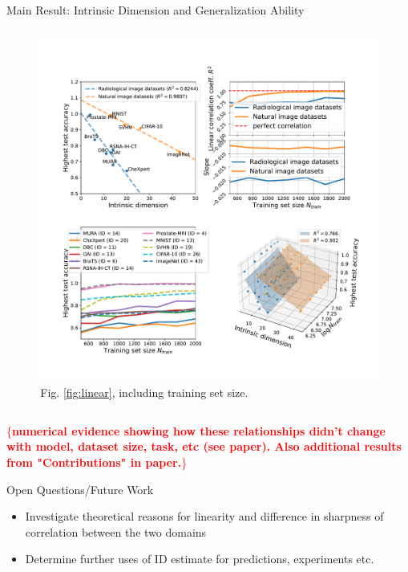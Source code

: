 \documentclass[final,hyperref={pdfpagelabels=false}]{beamer}
\newcommand{\todo}[1]{\textcolor{red}{\{\textbf{#1}\}}}
\begin{document}
\begin{frame}[t]
\begin{columns}[t]
\begin{column}{.3\textwidth}
\begin{block}{Main Result: Intrinsic Dimension and Generalization Ability}
\begin{columns}
    \begin{column}{.43\textwidth} %
    \centering
    \begin{figure}
        \includegraphics[width=0.95\linewidth]{frompaper/modified/main_fig_multi.pdf}
        \caption{\,Fig. \ref{fig:linear}, including training set size.}
    \end{figure}
    \end{column}
\end{columns}
\todo{numerical evidence showing how these relationships didn't change with model, dataset size, task, etc (see paper). Also additional results from "Contributions" in paper.}


\end{block}

\begin{block}{Open Questions/Future Work}

\begin{itemize}
\item Investigate theoretical reasons for linearity and difference in sharpness of correlation between the two domains
\item Determine further uses of ID estimate for predictions, experiments etc.
\end{itemize}

\end{block}



\end{column}
\end{columns}
\end{frame}
\end{document}
